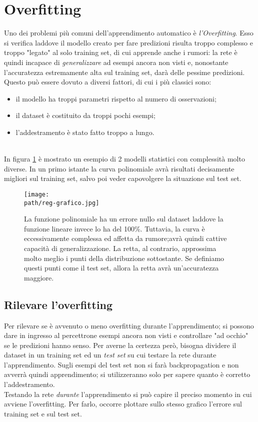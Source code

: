 \section{Overfitting}
Uno dei problemi più comuni dell'apprendimento automatico è \emph{l'Overfitting}. Esso si verifica laddove il modello creato per fare predizioni risulta troppo complesso e troppo "legato" al solo training set, di cui apprende anche i rumori: la rete è quindi incapace di \emph{generalizzare} ad esempi ancora non visti e, nonostante l'accuratezza estremamente alta sul training set, darà delle pessime predizioni. Questo può essere dovuto a diversi fattori, di cui i più classici sono: 
\begin{itemize}
\item il modello ha troppi parametri rispetto al numero di osservazioni; 
\item il dataset è costituito da troppi pochi esempi; 
\item l'addestramento è stato fatto troppo a lungo.
\end{itemize}
\\
In figura \ref{fig:regularization} è mostrato un esempio di 2 modelli statistici con complessità molto diverse. In un primo istante la curva polinomiale avrà risultati decisamente migliori sul training set, salvo poi veder capovolgere la situazione sul test set.
\begin{figure}[h!]
 \centering
 \texttt{[image: \\path/reg-grafico.jpg]}
 \caption{La funzione polinomiale ha un errore nullo sul dataset laddove la funzione lineare invece lo ha del 100\%. Tuttavia, la curva è eccessivamente complessa ed affetta da rumore;avrà quindi cattive capacità di generalizzazione. La retta, al contrario, approssima molto meglio i punti della distribuzione sottostante. Se definiamo questi punti come il test set, allora la retta avrà un'accuratezza maggiore.}
 \label{fig:regularization}
\end{figure}
\subsection{Rilevare l'overfitting}
Per rilevare se è avvenuto o meno overfitting durante l'apprendimento; si possono dare in ingresso al percettrone esempi ancora non visti e controllare "ad occhio" se le predizioni hanno senso. Per averne la certezza però, bisogna dividere il dataset in un training set ed un \emph{test set} su cui testare la rete durante l'apprendimento. Sugli esempi del test set non si farà backpropagation e non avverrà quindi apprendimento; si utilizzeranno solo per sapere quanto è corretto l'addestramento. \\
Testando la rete \emph{durante} l'apprendimento si può capire il preciso momento in cui avviene l'overfitting. Per farlo, occorre plottare sullo stesso grafico l'errore sul training set e sul test set. 

